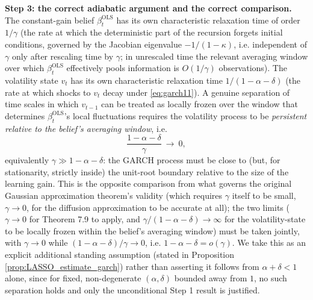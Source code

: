 \textbf{Step 3: the correct adiabatic argument and the correct comparison.} The constant-gain belief
$\beta_t^{\mathrm{OLS}}$ has its own characteristic relaxation time of order $1/\gamma$ (the rate at
which the deterministic part of the recursion forgets initial conditions, governed by the Jacobian
eigenvalue $-1/(1-\kappa)$, i.e. independent of $\gamma$ only after rescaling time by $\gamma$; in
unrescaled time the relevant averaging window over which $\beta_t^{\mathrm{OLS}}$ effectively pools
information is $O(1/\gamma)$ observations). The volatility state $v_t$ has its own characteristic
relaxation time $1/(1-\alpha-\delta)$ (the rate at which shocks to $v_t$ decay under \eqref{eq:garch11}).
A genuine separation of time scales in which $v_{t-1}$ can be treated as locally frozen over the
window that determines $\beta_t^{\mathrm{OLS}}$'s local fluctuations requires the volatility process to
be \emph{persistent relative to the belief's averaging window}, i.e.
\[
\frac{1-\alpha-\delta}{\gamma}\ \longrightarrow\ 0,
\]
equivalently $\gamma \gg 1-\alpha-\delta$: the GARCH process must be close to (but, for stationarity,
strictly inside) the unit-root boundary relative to the size of the learning gain. This is the opposite
comparison from what governs the original Gaussian approximation theorem's validity (which requires
$\gamma$ itself to be small, $\gamma\to 0$, for the diffusion approximation to be accurate at all); the
two limits ($\gamma\to 0$ for Theorem 7.9 to apply, and $\gamma/(1-\alpha-\delta)\to\infty$ for the
volatility-state to be locally frozen within the belief's averaging window) must be taken jointly,
with $\gamma\to 0$ while $(1-\alpha-\delta)/\gamma\to 0$, i.e. $1-\alpha-\delta = o(\gamma)$. We take this
as an explicit additional standing assumption (stated in Proposition \ref{prop:LASSO_estimate_garch})
rather than asserting it follows from $\alpha+\delta<1$ alone, since for fixed, non-degenerate
$(\alpha,\delta)$ bounded away from $1$, no such separation holds and only the unconditional Step 1
result is justified.

